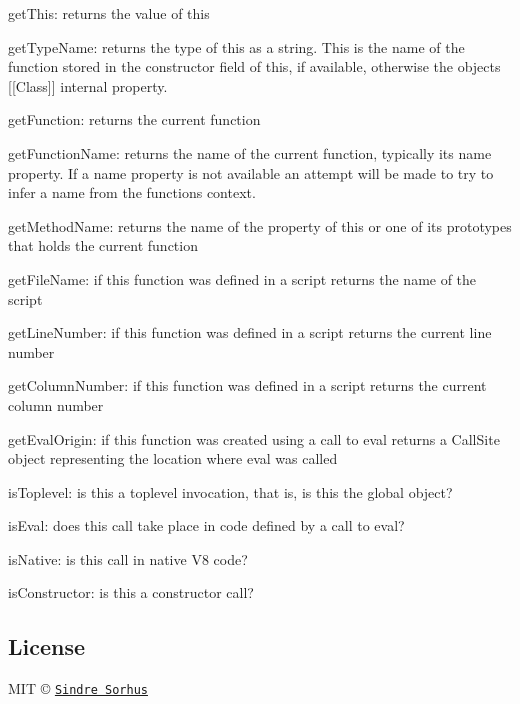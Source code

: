 \begin{DoxyItemize}
\item {\ttfamily get\+This}\+: returns the value of this
\item {\ttfamily get\+Type\+Name}\+: returns the type of this as a string. This is the name of the function stored in the constructor field of this, if available, otherwise the object\textquotesingle{}s \mbox{[}\mbox{[}Class\mbox{]}\mbox{]} internal property.
\item {\ttfamily get\+Function}\+: returns the current function
\item {\ttfamily get\+Function\+Name}\+: returns the name of the current function, typically its name property. If a name property is not available an attempt will be made to try to infer a name from the function\textquotesingle{}s context.
\item {\ttfamily get\+Method\+Name}\+: returns the name of the property of this or one of its prototypes that holds the current function
\item {\ttfamily get\+File\+Name}\+: if this function was defined in a script returns the name of the script
\item {\ttfamily get\+Line\+Number}\+: if this function was defined in a script returns the current line number
\item {\ttfamily get\+Column\+Number}\+: if this function was defined in a script returns the current column number
\item {\ttfamily get\+Eval\+Origin}\+: if this function was created using a call to eval returns a Call\+Site object representing the location where eval was called
\item {\ttfamily is\+Toplevel}\+: is this a toplevel invocation, that is, is this the global object?
\item {\ttfamily is\+Eval}\+: does this call take place in code defined by a call to eval?
\item {\ttfamily is\+Native}\+: is this call in native V8 code?
\item {\ttfamily is\+Constructor}\+: is this a constructor call?
\end{DoxyItemize}

\subsection*{License}

M\+IT © \href{http://sindresorhus.com}{\tt Sindre Sorhus} 